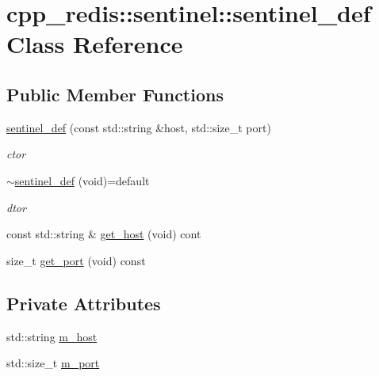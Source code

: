 \hypertarget{classcpp__redis_1_1sentinel_1_1sentinel__def}{}\section{cpp\+\_\+redis\+:\+:sentinel\+:\+:sentinel\+\_\+def Class Reference}
\label{classcpp__redis_1_1sentinel_1_1sentinel__def}
\subsection*{Public Member Functions}
\begin{DoxyCompactItemize}
\item 
\hyperlink{classcpp__redis_1_1sentinel_1_1sentinel__def_ab13345b9612cb7ea8e93594166a90f88}{sentinel\+\_\+def} (const std\+::string \&host, std\+::size\+\_\+t port)
\begin{DoxyCompactList}\small\item\em ctor \end{DoxyCompactList}\item 
\hyperlink{classcpp__redis_1_1sentinel_1_1sentinel__def_a5189d8016d9b385099e5ee0828ed7666}{$\sim$sentinel\+\_\+def} (void)=default
\begin{DoxyCompactList}\small\item\em dtor \end{DoxyCompactList}\item 
const std\+::string \& \hyperlink{classcpp__redis_1_1sentinel_1_1sentinel__def_af60fe867e85e9f4b648ccdc6e683545c}{get\+\_\+host} (void) cont
\item 
size\+\_\+t \hyperlink{classcpp__redis_1_1sentinel_1_1sentinel__def_a1994bec14cc8703d1198de96b66a0f30}{get\+\_\+port} (void) const
\end{DoxyCompactItemize}
\subsection*{Private Attributes}
\begin{DoxyCompactItemize}
\item 
std\+::string \hyperlink{classcpp__redis_1_1sentinel_1_1sentinel__def_a5f5efdba90e4fe48c645d91b8bd5630b}{m\+\_\+host}
\item 
std\+::size\+\_\+t \hyperlink{classcpp__redis_1_1sentinel_1_1sentinel__def_a24d75c0372a036370706db65f8c2268f}{m\+\_\+port}
\end{DoxyCompactItemize}


